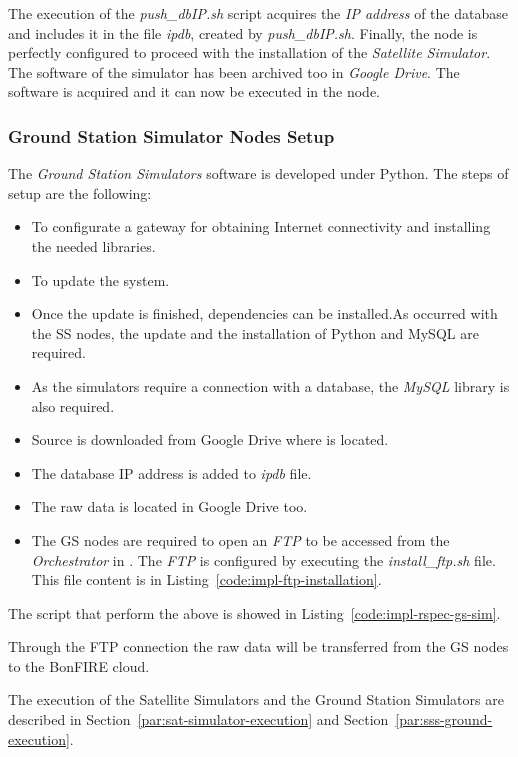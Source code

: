 The execution of the \emph{push\_dbIP.sh} script acquires the \emph{IP address} of the database and includes it in the file \emph{ipdb}, created by \emph{push\_dbIP.sh}.
Finally, the node is perfectly configured to proceed with the installation of the
\emph{Satellite Simulator}. The software of the simulator has been archived too in
\emph{Google Drive}. The software is acquired and it can now be executed in the node.


\subsubsection{Ground Station Simulator Nodes Setup}


The \emph{Ground Station Simulators} software is developed under Python. The steps of
setup are the following:
\begin{itemize}
\item To configurate a gateway for obtaining Internet connectivity and installing the
  needed libraries.
\item To update the system.
\item Once the update is finished, dependencies can be installed.As occurred with the SS nodes, the update and the installation of Python and MySQL are required.
\item As the simulators require a connection with a database, the \emph{MySQL} library is
  also required. 
\item Source is downloaded from Google Drive where is located.
\item The database IP address is added to \emph{ipdb} file.
\item  The raw data is located in Google Drive too.  
\item The GS nodes are required to open an \emph{FTP} to be accessed from the
\emph{Orchestrator} in \bonfire. The \emph{FTP} is configured by executing the
\emph{install\_ftp.sh} file. This file content is in Listing~\ref{code:impl-ftp-installation}.  
\end{itemize}

The script that perform the above is showed in Listing~\ref{code:impl-rspec-gs-sim}.







Through the FTP connection the raw data will be transferred from the GS nodes to the BonFIRE cloud. 

The execution of the Satellite Simulators and the Ground Station Simulators are described
in Section~\ref{par:sat-simulator-execution} and Section~\ref{par:sss-ground-execution}. 

